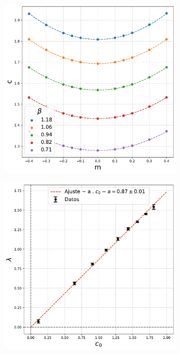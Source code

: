 \begin{figure}[t]
    \hspace*{-1cm}
\begin{subfigure}{0.55\textwidth}
    \centering
    \includegraphics[width=\textwidth]{tilted_velocity.pdf}
    \caption{}
\end{subfigure}
\begin{subfigure}{0.55\textwidth}
    \centering
    \includegraphics[width=\textwidth]{lambdavsc.pdf}

\end{subfigure}
\end{figure}
